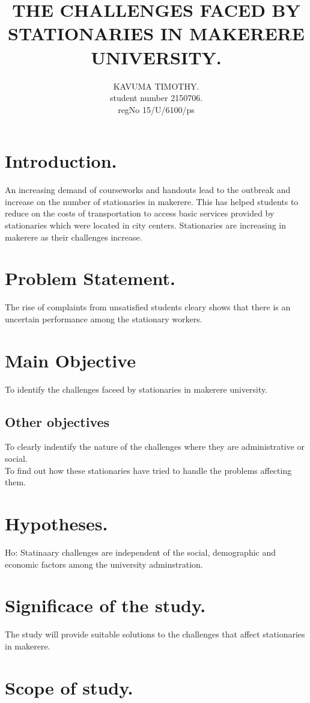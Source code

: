 \documentclass[a4paper,10pt]{article}
\begin{document}
\title{THE CHALLENGES FACED BY STATIONARIES IN MAKERERE UNIVERSITY.}
\author{
KAVUMA TIMOTHY.\\
student number 2150706.\\
regNo  15/U/6100/ps
}


\maketitle
\newpage
\section{Introduction.}
An increasing demand of courseworks and handouts lead to the outbreak and increase on the number of stationaries in makerere. This has helped students to reduce on the costs of transportation to access basic services provided by stationaries which were located in city centers. Stationaries are increasing in makerere as their challenges increase.

\section{ Problem Statement.}
The rise of complaints from unsatisfied students cleary shows that there is an uncertain performance among the stationary workers. 
\section{Main Objective}
To identify the challenges faceed by stationaries in makerere university.
\subsection{Other objectives}
To clearly indentify the nature of the challenges where they are administrative or social.\\
To find out how these stationaries have tried to handle the problems affecting them.

\section{Hypotheses.}
Ho: Statinaary challenges are independent of the social, demographic and economic factors among the university adminstration.
\section{Significace of the study.}
The study will provide suitable solutions to the challenges that affect stationaries in makerere.
\section{Scope of study.}
\end{document}
